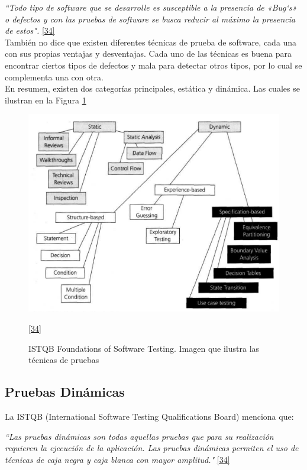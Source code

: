  \textit {``Todo tipo de software que se desarrolle es susceptible a la presencia de «Bug`s» o defectos y con las pruebas de software se busca reducir al máximo la presencia de estos".} \hyperlink{b34}{[34]} \\

También no dice que existen diferentes técnicas de prueba de software, cada una con sus propias ventajas y desventajas. Cada uno de las técnicas es buena para encontrar ciertos tipos  de defectos y mala para detectar otros tipos, por lo cual se complementa una con otra.\\

En resumen, existen dos categorías principales, estática y dinámica. Las cuales se ilustran en la Figura \ref{fig:tecnicas}
 
\begin{figure}[H]
	\begin{center}
		\includegraphics[width=.80\textwidth]{images/marcoteorico/tecnicas}
		\caption{ISTQB Foundations of Software Testing. Imagen que ilustra las técnicas de pruebas}
		\label{fig:tecnicas}
		\hyperlink{b34}{[34]}
	\end{center}
\end{figure}

\subsection{Pruebas Dinámicas}

La ISTQB (International Software Testing Qualifications Board) menciona que:

\textit {``Las pruebas dinámicas son todas aquellas pruebas que para su realización requieren la ejecución de la aplicación. Las pruebas dinámicas permiten el uso de técnicas de caja negra y caja blanca con mayor amplitud."} \hyperlink{b34}{[34]} 

